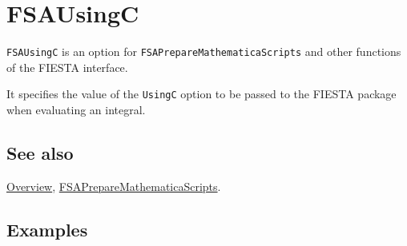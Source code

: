 \documentclass[../FeynHelpersManual.tex]{subfiles}
\begin{document}
\hypertarget{fsausingc}{
\section{FSAUsingC}\label{fsausingc}}

\texttt{FSAUsingC} is an option for
\texttt{FSAPrepareMathematicaScripts} and other functions of the FIESTA
interface.

It specifies the value of the \texttt{UsingC} option to be passed to the
FIESTA package when evaluating an integral.

\subsection{See also}

\hyperlink{toc}{Overview},
\hyperlink{fsapreparemathematicascripts}{FSAPrepareMathematicaScripts}.

\subsection{Examples}
\end{document}
